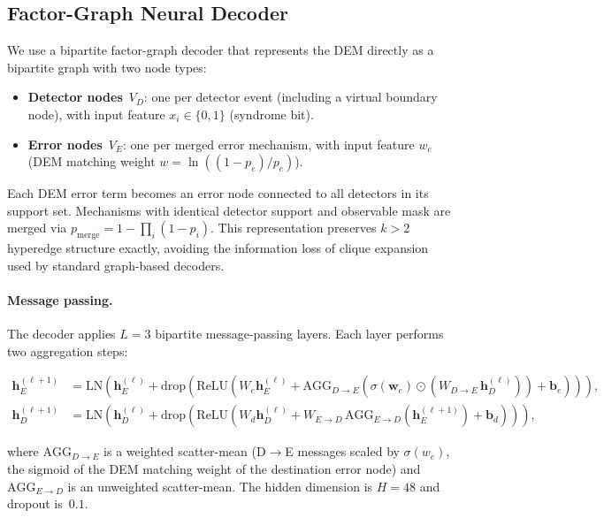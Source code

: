 \subsection{Factor-Graph Neural Decoder}

We use a bipartite factor-graph decoder that represents the DEM directly as a bipartite graph with two node types:
\begin{itemize}
\item \textbf{Detector nodes}~$V_D$: one per detector event (including a virtual boundary node), with input feature $x_i \in \{0,1\}$ (syndrome bit).
\item \textbf{Error nodes}~$V_E$: one per merged error mechanism, with input feature $w_e$ (DEM matching weight $w = \ln((1-p_e)/p_e)$).
\end{itemize}

Each DEM error term becomes an error node connected to all detectors in its support set. Mechanisms with identical detector support and observable mask are merged via $p_{\text{merge}} = 1 - \prod_i (1 - p_i)$. This representation preserves $k{>}2$ hyperedge structure exactly, avoiding the information loss of clique expansion used by standard graph-based decoders.

\paragraph{Message passing.} The decoder applies $L{=}3$ bipartite message-passing layers. Each layer performs two aggregation steps:
\begin{widetext}
\begin{align}
\mathbf{h}_{E}^{(\ell+1)} &= \mathrm{LN}\!\left(\mathbf{h}_{E}^{(\ell)} + \mathrm{drop}\!\left(\mathrm{ReLU}\!\left(W_e \mathbf{h}_{E}^{(\ell)} + \mathrm{AGG}_{D \to E}\!\left(\sigma(\mathbf{w}_e) \odot \left(W_{D \to E}\,\mathbf{h}_{D}^{(\ell)}\right)\right) + \mathbf{b}_e\right)\right)\right), \\
\mathbf{h}_{D}^{(\ell+1)} &= \mathrm{LN}\!\left(\mathbf{h}_{D}^{(\ell)} + \mathrm{drop}\!\left(\mathrm{ReLU}\!\left(W_d \mathbf{h}_{D}^{(\ell)} + W_{E \to D}\,\mathrm{AGG}_{E \to D}\!\left(\mathbf{h}_{E}^{(\ell+1)}\right) + \mathbf{b}_d\right)\right)\right),
\end{align}
\end{widetext}
where $\mathrm{AGG}_{D \to E}$ is a weighted scatter-mean (D$\to$E messages scaled by $\sigma(w_e)$, the sigmoid of the DEM matching weight of the destination error node) and $\mathrm{AGG}_{E \to D}$ is an unweighted scatter-mean. The hidden dimension is $H{=}48$ and dropout is~$0.1$.

